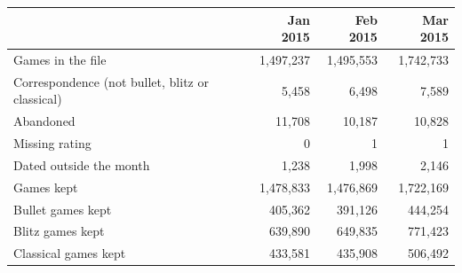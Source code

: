 \begin{tabular}{lrrr}
\toprule
 & Jan 2015 & Feb 2015 & Mar 2015 \\
\midrule
Games in the file & 1,497,237 & 1,495,553 & 1,742,733 \\
Correspondence (not bullet, blitz or classical) & 5,458 & 6,498 & 7,589 \\
Abandoned & 11,708 & 10,187 & 10,828 \\
Missing rating & 0 & 1 & 1 \\
Dated outside the month & 1,238 & 1,998 & 2,146 \\
\midrule
Games kept & 1,478,833 & 1,476,869 & 1,722,169 \\
Bullet games kept & 405,362 & 391,126 & 444,254 \\
Blitz games kept & 639,890 & 649,835 & 771,423 \\
Classical games kept & 433,581 & 435,908 & 506,492 \\
\bottomrule
\end{tabular}
